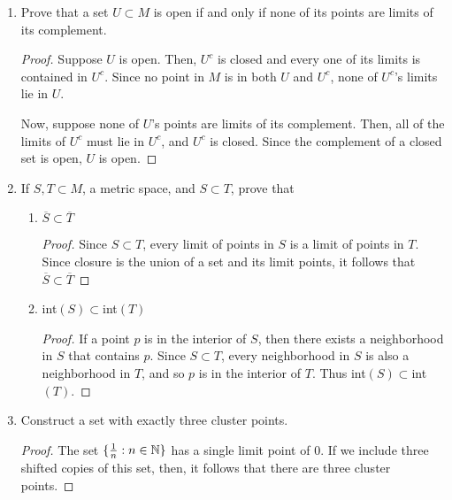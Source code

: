 \documentclass[11pt, a4paper, latinreim, shortsets]{notes}
\begin{document}
\begin{enumerate}[label={\bfseries 2.\arabic*}]
\begin{proof}
	Now suppose that every neighborhood of $p$ contains another distinct point $q$ in $S$. Let
	$r' = d(p,q)$. Then, it follows that the neighborhood $M_{r'}(p) \cap S$ contains a point distinct
	from $p$ and $q$. Thus, for any finite set of points, we can find another distinct point closer to
	$p$, and so the set must be infinite.
	\end{proof}

	\item Prove that a set $U \subset M$ is open if and only if none of its points are limits of
	its complement.
	\begin{proof}
	Suppose $U$ is open. Then, $U^c$ is closed and every one of its limits is contained in $U^c$.
	Since no point in $M$ is in both $U$ and $U^c$, none of $U^c$'s limits lie in $U$.

	Now, suppose none of $U$'s points are limits of its complement. Then, all of the limits of
	$U^c$ must lie in $U^c$, and $U^c$ is closed. Since the complement of a closed set is open,
	$U$ is open.
	\end{proof}

	\item If $S,T \subset M$, a metric space, and $S \subset T$, prove that
	\begin{enumerate}[label=\alph*)]
		\item $\overline{S} \subset \overline{T}$
	\begin{proof}
		Since $S \subset T$, every limit of points in $S$ is a limit of points in $T$. Since closure
		is the union of a set and its limit points, it follows that $\overline{S} \subset \overline{T}$
	\end{proof}
		\item int$(S)\subset$int$(T)$
	\begin{proof}
		If a point $p$ is in the interior of $S$, then there exists a neighborhood in $S$ that contains
		$p$. Since $S \subset T$, every neighborhood in $S$ is also a neighborhood in $T$, and so $p$
		is in the interior of $T$. Thus int$(S)\subset$int$(T)$.
	\end{proof}
	\end{enumerate}

	\item Construct a set with exactly three cluster points.
	\begin{proof}
		The set $\{\frac{1}{n} : n \in \mathbb{N}\}$ has a single limit point of 0. If we include three shifted
		copies of this set, then, it follows that there are three cluster points.
	\end{proof}


\end{enumerate}
\end{document}
